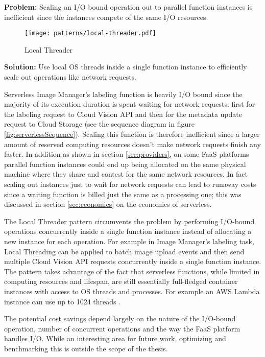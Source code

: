 \textbf{Problem:} Scaling an I/O bound operation out to parallel function instances is inefficient since the instances compete of the same I/O resources.

\begin{figure}[h]
  \centering
  \texttt{[image: patterns/local-threader.pdf]}
  \caption{Local Threader}
  \label{fig:localThreader}
\end{figure}

\textbf{Solution:} Use local OS threads inside a single function instance to efficiently scale out operations like network requests.

Serverless Image Manager's labeling function is heavily I/O bound since the majority of its execution duration is spent waiting for network requests: first for the labeling request to Cloud Vision API and then for the metadata update request to Cloud Storage (see the sequence diagram in figure \ref{fig:serverlessSequence}). Scaling this function is therefore inefficient since a larger amount of reserved computing resources doesn't make network requests finish any faster. In addition as shown in section \ref{sec:providers}, on some FaaS platforms parallel function instances could end up being allocated on the same physical machine where they share and contest for the same network resources. In fact scaling out instances just to wait for network requests can lead to runaway costs since a waiting function is billed just the same as a processing one; this was discussed in section \ref{sec:economics} on the economics of serverless.

The Local Threader pattern circumvents the problem by performing I/O-bound operations concurrently inside a single function instance instead of allocating a new instance for each operation. For example in Image Manager's labeling task, Local Threading can be applied to batch image upload events and then send multiple Cloud Vision API requests concurrently inside a single function instance. The pattern takes advantage of the fact that serverless functions, while limited in computing resources and lifespan, are still essentially full-fledged container instances with access to OS threads and processes. For example an AWS Lambda instance can use up to 1024 threads \parencite{awslambda0218}.

The potential cost savings depend largely on the nature of the I/O-bound operation, number of concurrent operations and the way the FaaS platform handles I/O. While an interesting area for future work, optimizing and benchmarking this is outside the scope of the thesis.

